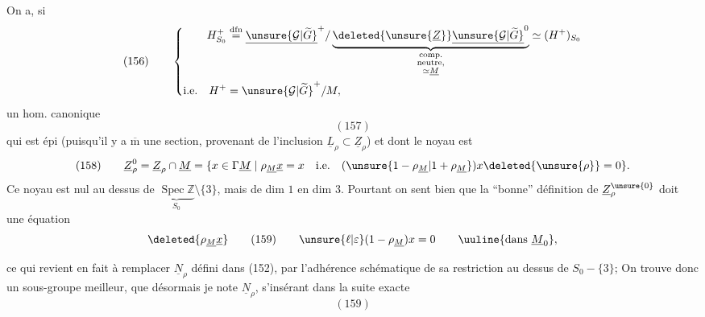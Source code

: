 On a, si
\[
(156)\qquad\left\{
\begin{aligned}
H^+_{S_0}&\overset{\mathrm{dfn}}{=}
\underline{\unsure{\mathcal G|\widetilde G}}^{+}/
\underbrace{\deleted{\unsure{\underline Z}}\underline{\unsure{\mathcal G|\widetilde G}}^{0}}_{\substack{\text{comp.}\\\text{neutre,}\\\simeq\underline M}}
\simeq(H^+)_{S_0}\\
\text{i.e.}\quad H^+&=\unsure{\mathcal G|\widetilde G}^{+}/M,
\end{aligned}\right.
\]
un hom. canonique
\[
(157)
\]
qui est épi (puisqu'il y a $\overline{\mathrm m}$ une section, provenant de l'inclusion $\underline L_\rho\subset\underline Z_\rho$) et dont le noyau est
\[
(158)\qquad
\underline Z_\rho^0=\underline Z_\rho\cap\underline M
=\{x\in\Gamma\underline M\mid\rho_{\underline M}\underline x=x\quad\text{i.e.}\quad(\unsure{1-\rho_{\underline M}|1+\rho_{\underline M}})x\deleted{\unsure{\rho}}=0\}.
\]
Ce noyau est nul au dessus de $\underbrace{\operatorname{Spec}\mathbb Z}_{S_0}\setminus\{3\}$,
mais de dim $1$ en dim $3$. Pourtant on sent bien que la ``bonne'' définition de $\underline Z_\rho^{\unsure{0}}$  doit  une équation
\[
\deleted{\rho_{\underline M}\underline x}\qquad
(159)\qquad \unsure{\ell|\varepsilon}(1-\rho_{\underline M})x=0\qquad\uuline{\text{dans }\underline M_0},
\]


ce qui revient en fait  à remplacer $\underline N_\rho$ défini dans (152), par l'adhérence schématique de sa restriction au dessus de $S_0-\{3\}$; On trouve donc un sous-groupe meilleur, que désormais je note $\underline N_\rho$, s'insérant dans la suite exacte
\[
(159)
\]

